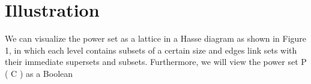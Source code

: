\section{Illustration}
\label{sec:illust}
We can visualize
the power set as a lattice in a Hasse diagram as shown in Figure 1, in which each
level contains subsets of a certain size and edges link sets with their immediate
supersets and subsets. Furthermore, we will view the power set P ( C ) as a Boolean